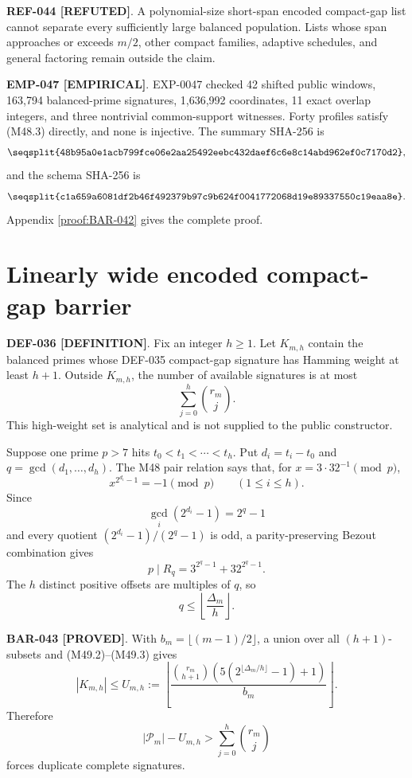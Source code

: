 \documentclass[11pt]{article}
\newcommand{\claimstatus}[2]{\textbf{#1 [#2]}}
\begin{document}
\claimstatus{REF-044}{REFUTED}. A polynomial-size short-span encoded
compact-gap list cannot separate every sufficiently large balanced
population. Lists whose span approaches or exceeds \(m/2\), other compact
families, adaptive schedules, and general factoring remain outside the
claim.

\claimstatus{EMP-047}{EMPIRICAL}. EXP-0047 checked 42 shifted public
windows, 163,794 balanced-prime signatures, 1,636,992 coordinates, 11 exact
overlap integers, and three nontrivial common-support witnesses. Forty
profiles satisfy (M48.3) directly, and none is injective. The summary
SHA-256 is
\[
\texttt{\seqsplit{48b95a0e1acb799fce06e2aa25492eebc432daef6c6e8c14abd962ef0c7170d2}},
\]
and the schema SHA-256 is
\[
\texttt{\seqsplit{c1a659a6081df2b46f492379b97c9b624f0041772068d19e89337550c19eaa8e}}.
\]
Appendix \ref{proof:BAR-042} gives the complete proof.

\section{Linearly wide encoded compact-gap barrier}

\claimstatus{DEF-036}{DEFINITION}. Fix an integer \(h\ge1\). Let
\(K_{m,h}\) contain the balanced primes whose DEF-035 compact-gap signature
has Hamming weight at least \(h+1\). Outside \(K_{m,h}\), the number of
available signatures is at most
\[
\sum_{j=0}^{h}\binom{r_m}{j}.
\tag{M49.1}
\]
This high-weight set is analytical and is not supplied to the public
constructor.

Suppose one prime \(p>7\) hits
\(t_0<t_1<\cdots<t_h\). Put \(d_i=t_i-t_0\) and
\(q=\gcd(d_1,\ldots,d_h)\). The M48 pair relation says that, for
\(x=3\cdot32^{-1}\pmod p\),
\[
x^{2^{d_i}-1}=-1\pmod p
\qquad(1\le i\le h).
\]
Since
\[
\gcd_i(2^{d_i}-1)=2^q-1
\]
and every quotient
\((2^{d_i}-1)/(2^q-1)\) is odd, a parity-preserving Bezout combination
gives
\[
p\mid R_q=3^{2^q-1}+32^{2^q-1}.
\tag{M49.2}
\]
The \(h\) distinct positive offsets are multiples of \(q\), so
\[
q\le\left\lfloor\frac{\Delta_m}{h}\right\rfloor.
\tag{M49.3}
\]

\claimstatus{BAR-043}{PROVED}. With
\(b_m=\lfloor(m-1)/2\rfloor\), a union over all \((h+1)\)-subsets and
(M49.2)--(M49.3) gives
\[
|K_{m,h}|
\le U_{m,h}:=
\left\lfloor
\frac{\binom{r_m}{h+1}
\left(5(2^{\lfloor\Delta_m/h\rfloor}-1)+1\right)}
{b_m}
\right\rfloor.
\tag{M49.4}
\]
Therefore
\[
|\mathcal P_m|-U_{m,h}>
\sum_{j=0}^{h}\binom{r_m}{j}
\tag{M49.5}
\]
forces duplicate complete signatures.
\end{document}
